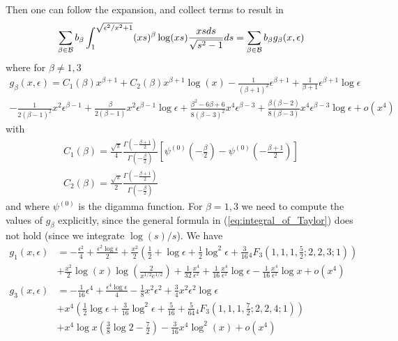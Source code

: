 \documentclass{article}
\begin{document}
Then one can follow the expansion, and collect terms to result in
\begin{align}
     \sum_{\beta \in \mathcal{B}}b_{\beta}\int_1^{\sqrt{\epsilon^2/x^2+1}} (xs)^{\beta} \log(xs) \frac{xs \space ds}{\sqrt{s^2-1}}ds = \sum_{\beta \in \mathcal{B}}b_{\beta}g_{\beta}(x,\epsilon)
\end{align}
where for $\beta \neq 1, 3$
\begin{align}
    g_{\beta}(x,\epsilon) = C_1(\beta)x^{\beta+1} + C_2(\beta)x^{\beta+1}\log(x) - \frac{1}{(\beta+1)^2}\epsilon^{\beta+1} + \frac{1}{\beta+1}\epsilon^{\beta+1}\log \epsilon \nonumber \\
    - \frac{1}{2(\beta-1)^2}x^2\epsilon^{\beta-1} + \frac{\beta}{2(\beta-1)}x^2\epsilon^{\beta-1}\log \epsilon + \frac{\beta^2-6\beta+6}{8(\beta-3)^2}x^4\epsilon^{\beta-3} + \frac{\beta(\beta-2)}{8(\beta-3)}x^4\epsilon^{\beta-3}\log \epsilon + o(x^4) 
\end{align}
with 
\begin{gather}
    C_1(\beta) = \frac{\sqrt{\pi}}{4}\frac{\Gamma(-\frac{\beta+1}{2})}{\Gamma(-\frac{\beta}{2})}\left[\psi^{(0)}\left(-\frac{\beta}{2}\right) - \psi^{(0)}\left(-\frac{\beta+1}{2}\right)\right] \nonumber \\
    C_2(\beta) = \frac{\sqrt{\pi}}{2}\frac{\Gamma(-\frac{\beta+1}{2})}{\Gamma(-\frac{\beta}{2})}
\end{gather}
and where $\psi^{(0)}$ is the digamma function. For $\beta=1,3$ we need to compute the values of $g_\beta$ explicitly, since the general formula in (\ref{eq:integral_of_Taylor}) does not hold (since we integrate $\log(s)/s$). We have
\begin{align}
    g_1(x,\epsilon) &= -\frac{\epsilon^2}{4} + \frac{\epsilon^2 \log \epsilon}{2} + \frac{x^2}{2}\left(\frac{1}{2} + \log \epsilon + \frac{1}{2}\log^2\epsilon + \frac{3}{16}{_4}F_3\left(1,1,1,\frac{5}{2};2,2,3;1\right) \right) \nonumber \\  
    &+\frac{x^2}{2}\log (x) \log\left(\frac{2}{x^{1/2}e^{1/2}}\right) + \frac{1}{32}\frac{x^4}{\epsilon^2}  + \frac{1}{16}\frac{x^4}{\epsilon^2}\log \epsilon - \frac{1}{16}\frac{x^4}{\epsilon^2}\log x + o(x^4) \nonumber \\
    g_3(x,\epsilon) &= -\frac{1}{16}\epsilon^4 + \frac{\epsilon^4 \log \epsilon}{4} - \frac{1}{8}x^2\epsilon^2 + \frac{3}{4}x^2\epsilon^2\log \epsilon  \nonumber \\
    &+ x^4 \left(\frac{1}{2}\log \epsilon + \frac{3}{16}\log^2 \epsilon + \frac{5}{16}+\frac{5}{64}{_4}F_3\left(1,1,1,\frac{7}{2};2,2,4;1\right) \right)  \nonumber \\& + x^4\log x \left(\frac{3}{8}\log 2 - \frac{7}{2}\right)  - \frac{3}{16}x^4 \log^2(x)+ o(x^4)
\end{align}
\end{document}
